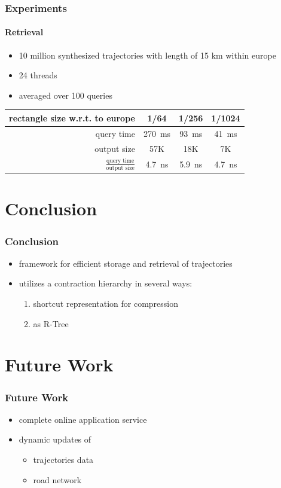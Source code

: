 \documentclass[10pt, t,
aspectratio=1610,%
usenames,
dvipsnames,
]{beamer}
\begin{document}
\begin{frame}
	\frametitle{Experiments}
	\framesubtitle{Retrieval}
	\begin{table}
		\begin{itemize}
			\item 10 million synthesized trajectories with length of 15 km within europe
			\item 24 threads
			\item averaged over 100 queries
		\end{itemize}

		\centering
		\begin{tabular}{|r||c|c|c|}
			\hline
			rectangle size w.r.t. to europe                & 1/64                     & 1/256                   & 1/1024                  \\
			\hline
			query time                                     & \SI{270}{\milli \second} & \SI{93}{\milli \second} & \SI{41}{\milli \second} \\
			output size                                    & 57K                      & 18K                     & 7K                      \\
			$\frac{\text{query time}}{\text{output size}}$ & \SI{4.7}{\nano \second}  & \SI{5.9}{\nano \second} & \SI{4.7}{\nano \second} \\
			\hline
		\end{tabular}
	\end{table}
\end{frame}

\section{Conclusion}
\begin{frame}
	\frametitle{Conclusion}
	\begin{itemize}
		\item framework for efficient storage and retrieval of trajectories \pause
		\item utilizes a contraction hierarchy in several ways: \pause
		      \begin{enumerate}
			      \item shortcut representation for compression \pause
			      \item as R-Tree
		      \end{enumerate}
	\end{itemize}
\end{frame}

\section{Future Work}
\begin{frame}
	\frametitle{Future Work}
	\begin{itemize}
		\item complete online application service \pause
		\item dynamic updates of
		      \begin{itemize}
			      \item trajectories data
			      \item road network
		      \end{itemize}
	\end{itemize}
\end{frame}

\end{document}
